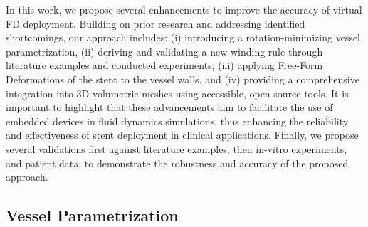 In this work, we propose several enhancements to improve the accuracy of virtual FD deployment. Building on prior research and addressing identified shortcomings, our approach includes: (i) introducing a rotation-minimizing vessel parametrization, (ii) deriving and validating a new winding rule through literature examples and conducted experiments, (iii) applying Free-Form Deformations of the stent to the vessel walls, and (iv) providing a comprehensive integration into 3D volumetric meshes using accessible, open-source tools. It is important to highlight that these advancements aim to facilitate the use of embedded devices in fluid dynamics simulations, thus enhancing the reliability and effectiveness of stent deployment in clinical applications. Finally, we propose several validations first against literature examples, then in-vitro experiments, and patient data, to demonstrate the robustness and accuracy of the proposed approach.

\subsection{Vessel Parametrization}
